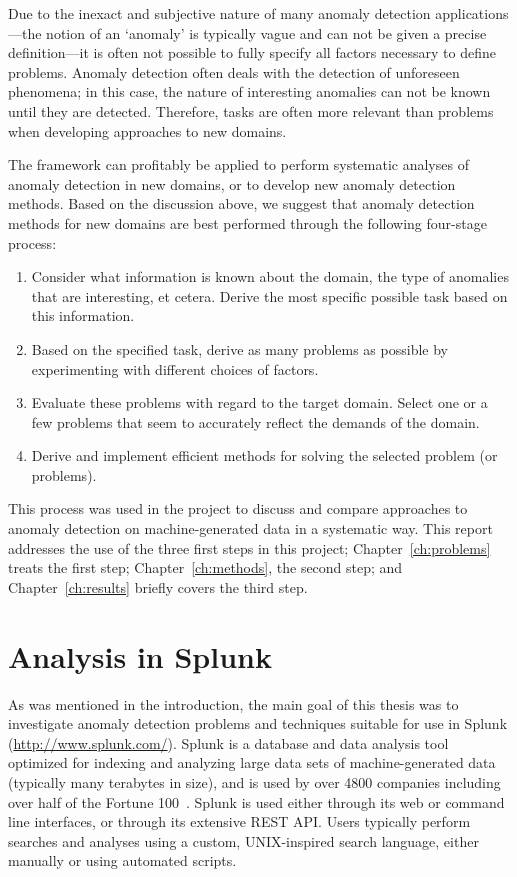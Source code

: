 Due to the inexact and subjective nature of many anomaly detection applications---the notion of an `anomaly' is typically vague and can not be given a precise definition---it is often not possible to fully specify all factors necessary to define problems. Anomaly detection often deals with the detection of unforeseen phenomena; in this case, the nature of interesting anomalies can not be known until they are detected. Therefore, tasks are often more relevant than problems when developing approaches to new domains.

The framework can profitably be applied to perform systematic analyses of anomaly detection in new domains, or to develop new anomaly detection methods. Based on the discussion above, we suggest that anomaly detection methods for new domains are best performed through the following four-stage process:
\begin{enumerate}
  \item Consider what information is known about the domain, the type of anomalies that are interesting, et cetera. Derive the most specific possible task based on this information.
  \item Based on the specified task, derive as many problems as possible by experimenting with different choices of factors.
  \item Evaluate these problems with regard to the target domain. Select one or a few problems that seem to accurately reflect the demands of the domain.
  \item Derive and implement efficient methods for solving the selected problem (or problems).
\end{enumerate}

This process was used in the project to discuss and compare approaches to anomaly detection on machine-generated data in a systematic way. This report addresses the use of the three first steps in this project; Chapter~\ref{ch:problems} treats the first step; Chapter~\ref{ch:methods}, the second step; and Chapter~\ref{ch:results} briefly covers the third step.

\section{Analysis in Splunk}
\label{sect:splunk}

As was mentioned in the introduction, the main goal of this thesis was to investigate anomaly detection problems and techniques suitable for use in Splunk (\url{http://www.splunk.com/}). Splunk is a database and data analysis tool optimized for indexing and analyzing large data sets of machine-generated data (typically many terabytes in size), and is used by over 4800 companies including over half of the Fortune 100~\cite{splunk}. Splunk is used either through its web or command line interfaces, or through its extensive REST API\@. Users typically perform searches and analyses using a custom, UNIX-inspired search language, either manually or using automated scripts.

